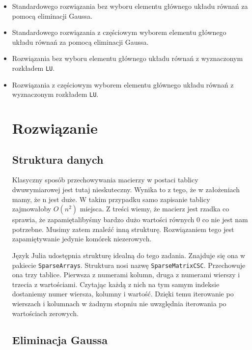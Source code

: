 \documentclass{article}
\begin{document}
\begin{itemize}
    \item Standardowego rozwiązania bez wyboru elementu głównego układu równań za pomocą eliminacji Gaussa.
    \item Standardowego rozwiązania z częściowym wyborem elementu głównego układu równań za pomocą eliminacji Gaussa.
    \item Rozwiązania bez wyboru elementu głównego układu równań z wyznaczonym rozkładem \texttt{LU}.
    \item Rozwiązania z częściowym wyborem elementu głównego układu równań z wyznaczonym rozkładem \texttt{LU}.

\section*{Rozwiązanie}
\subsection*{Struktura danych}
Klasyczny sposób przechowywania macierzy w postaci tablicy dwuwymiarowej jest tutaj nieskuteczny. Wynika to z tego, że w założeniach mamy, że n jest duże. W takim przypadku samo zapisanie tablicy zajmowałoby $O(n^2)$ miejsca. Z treści wiemy, że macierz jest rzadka co sprawia, że zapamiętalibyśmy bardzo dużo wartości równych $0$ co nie jest nam potrzebne. Musimy zatem znaleźć inną strukturę. Rozwiązaniem tego jest zapamiętywanie jedynie komórek niezerowych.

Język Julia udostępnia strukturę idealną do tego zadania. Znajduje się ona w pakiecie \texttt{SparseArrays}. Struktura nosi nazwę \texttt{SparseMatrixCSC}. Przechowuje ona trzy tablice. Pierwsza z numerami kolumn, druga z numerami wierszy i trzecia z wartościami. Czytając każdą z nich na tym samym indeksie dostaniemy numer wiersza, kolumny i wartość. Dzięki temu iterowanie po wierszach i kolumnach w żadnym stopniu nie uwzględnia iterowania po wartościach zerowych.
\subsection*{Eliminacja Gaussa}

\end{itemize}
\end{document}
